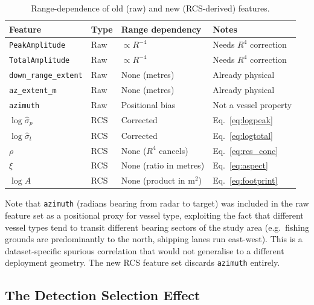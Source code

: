 \documentclass[journal]{IEEEtran}
\begin{document}
\begin{table}[H]
\centering
\caption{Range-dependence of old (raw) and new (RCS-derived) features.}
\label{tab:feature_comparison}
\begin{tabular}{llll}
\toprule
\textbf{Feature} & \textbf{Type} & \textbf{Range dependency} & \textbf{Notes} \\
\midrule
\texttt{PeakAmplitude}   & Raw    & $\propto R^{-4}$          & Needs $R^4$ correction \\
\texttt{TotalAmplitude}  & Raw    & $\propto R^{-4}$          & Needs $R^4$ correction \\
\texttt{down\_range\_extent} & Raw & None (metres)            & Already physical \\
\texttt{az\_extent\_m}   & Raw    & None (metres)             & Already physical \\
\texttt{azimuth}         & Raw    & Positional bias           & Not a vessel property \\
\midrule
$\log\hat{\sigma}_p$     & RCS    & Corrected                 & Eq.~\ref{eq:logpeak} \\
$\log\hat{\sigma}_t$     & RCS    & Corrected                 & Eq.~\ref{eq:logtotal} \\
$\rho$                   & RCS    & None ($R^4$ cancels)      & Eq.~\ref{eq:rcs_conc} \\
$\xi$                    & RCS    & None (ratio in metres)    & Eq.~\ref{eq:aspect} \\
$\log A$                 & RCS    & None (product in m$^2$)   & Eq.~\ref{eq:footprint} \\
\bottomrule
\end{tabular}
\end{table}

Note that \texttt{azimuth} (radians bearing from radar to target) was
included in the raw feature set as a positional proxy for vessel type,
exploiting the fact that different vessel types tend to transit
different bearing sectors of the study area (e.g.\ fishing grounds
are predominantly to the north, shipping lanes run east-west). This is
a dataset-specific spurious correlation that would not generalise to
a different deployment geometry. The new RCS feature set discards
\texttt{azimuth} entirely.

\subsection{The Detection Selection Effect}
\label{sec:selection}
\end{document}
